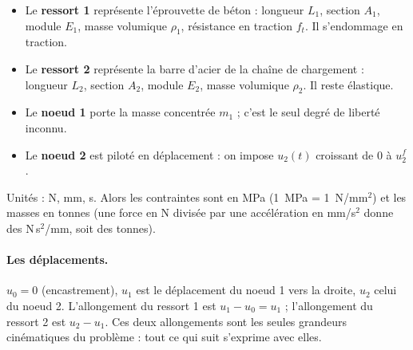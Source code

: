 \documentclass[11pt,a4paper]{article}
\newcommand{\kd}{k_1^{d}}
\begin{document}
\begin{center}
\end{center}

\begin{itemize}[nosep]
  \item Le \textbf{ressort 1} représente l'éprouvette de béton : longueur $L_1$, section $A_1$,
        module $E_1$, masse volumique $\rho_1$, résistance en traction $f_t$. Il s'endommage en
        traction.
  \item Le \textbf{ressort 2} représente la barre d'acier de la chaîne de chargement : longueur
        $L_2$, section $A_2$, module $E_2$, masse volumique $\rho_2$. Il reste élastique.
  \item Le \textbf{noeud 1} porte la masse concentrée $m_1$ ; c'est le seul degré de liberté
        inconnu.
  \item Le \textbf{noeud 2} est piloté en déplacement : on impose $u_2(t)$ croissant de $0$ à $u_2^f$.
\end{itemize}
Unités : N, mm, s. Alors les contraintes sont en MPa (1~MPa = 1~N/mm$^2$) et les masses en
tonnes (une force en N divisée par une accélération en mm/s$^2$ donne des N\,s$^2$/mm, soit des
tonnes).

\paragraph{Les déplacements.} $u_0 = 0$ (encastrement), $u_1$ est le déplacement du noeud 1 vers la
droite, $u_2$ celui du noeud 2. L'allongement du ressort 1 est $u_1 - u_0 = u_1$ ; l'allongement du
ressort 2 est $u_2 - u_1$. Ces deux allongements sont les seules grandeurs cinématiques du
problème : tout ce qui suit s'exprime avec elles.
\end{document}
